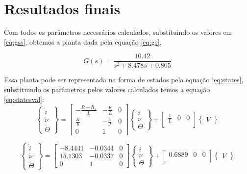 \documentclass{article}
\begin{document}
\section{Resultados finais}
Com todos os parâmetros necessários calculados, substituindo os valores em \ref{eq:gss}, obtemos a planta dada pela equação \ref{eq:gs}.

\begin{equation}
\label{eq:gs}
G(s)=\frac{10.42}{s^2 + 8.478s + 0.805}
\end{equation}

Essa planta pode ser representada na forma de estados pela equação \ref{eq:states}, substituindo os parâmetros pelos valores calculados temos a equação \ref{eq:statesval}:
\begin{equation}
\label{eq:states}
\begin{Bmatrix}
\dot{i}\\ \dot{\nu} \\ \dot{\Theta} 
\end{Bmatrix} =
\begin{bmatrix}
-\frac{R+R_s}{L} & -\frac{K}{L} & 0\\
\frac{K}{b} & -\frac{b}{J} & 0\\
0 & 1 & 0
\end{bmatrix}
\begin{Bmatrix}
i\\ \nu \\ \Theta 
\end{Bmatrix} + 
\begin{bmatrix}
\frac{1}{L} & 0 & 0\\
\end{bmatrix}
\begin{Bmatrix}
V 
\end{Bmatrix}
\end{equation}

\begin{equation}
\label{eq:statesval}
\begin{Bmatrix}
\dot{i}\\ \dot{\nu} \\ \dot{\Theta} 
\end{Bmatrix} =
\begin{bmatrix}
-8.4441 & -0.0344 & 0\\
15.1303 & -0.0337 & 0\\
0 & 1 & 0
\end{bmatrix}
\begin{Bmatrix}
i\\ \nu \\ \Theta 
\end{Bmatrix} + 
\begin{bmatrix}
0.6889 & 0 & 0\\
\end{bmatrix}
\begin{Bmatrix}
V 
\end{Bmatrix}
\end{equation}
\end{document}
